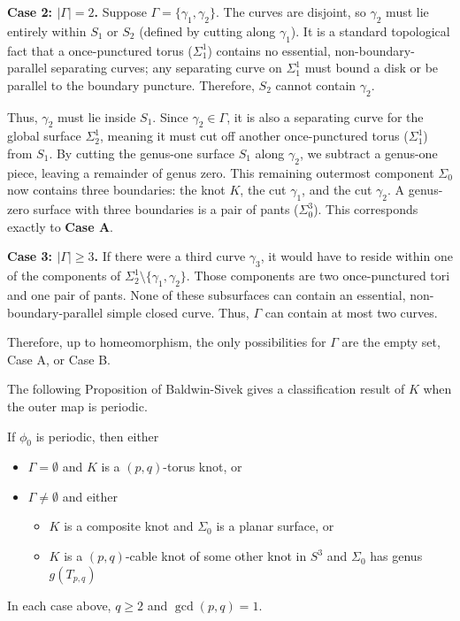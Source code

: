 \begin{myproof}
    \textbf{Case 2: $|\Gamma| = 2$.}
    Suppose $\Gamma = \{\gamma_1, \gamma_2\}$. The curves are disjoint, so $\gamma_2$ must lie entirely within $S_1$ or $S_2$ (defined by cutting along $\gamma_1$). It is a standard topological fact that a once-punctured torus ($\Sigma_1^1$) contains no essential, non-boundary-parallel separating curves; any separating curve on $\Sigma_1^1$ must bound a disk or be parallel to the boundary puncture. Therefore, $S_2$ cannot contain $\gamma_2$.

    Thus, $\gamma_2$ must lie inside $S_1$. Since $\gamma_2 \in \Gamma$, it is also a separating curve for the global surface $\Sigma_2^1$, meaning it must cut off another once-punctured torus ($\Sigma_1^1$) from $S_1$.
    By cutting the genus-one surface $S_1$ along $\gamma_2$, we subtract a genus-one piece, leaving a remainder of genus zero. This remaining outermost component $\Sigma_0$ now contains three boundaries: the knot $K$, the cut $\gamma_1$, and the cut $\gamma_2$. A genus-zero surface with three boundaries is a pair of pants ($\Sigma_0^3$). This corresponds exactly to \textbf{Case A}.

    \textbf{Case 3: $|\Gamma| \geq 3$.} If there were a third curve $\gamma_3$, it would have to reside within one of the components of $\Sigma_2^1 \setminus \{\gamma_1, \gamma_2\}$. Those components are two once-punctured tori and one pair of pants. None of these subsurfaces can contain an essential, non-boundary-parallel simple closed curve. Thus, $\Gamma$ can contain at most two curves.

    Therefore, up to homeomorphism, the only possibilities for $\Gamma$ are the empty set, Case A, or Case B.
\end{myproof}



The following Proposition of Baldwin-Sivek gives a classification result of $K$ when the outer map is periodic.

\begin{prop} \label{prop:knottracesprop}
If $\phi_0$ is periodic, then either
    \begin{itemize}
        \item $\Gamma = \emptyset$ and $K$ is a $(p, q)$-torus knot, or
        \item $\Gamma  \neq \emptyset$ and either
        \begin{itemize}
            \item $K$ is a composite knot and $\Sigma_0$ is a planar surface, or
            \item $K$ is a $(p, q)$-cable knot of some other knot in $S^3$ and $\Sigma_0$ has genus $g(T_{p,q})$
        \end{itemize}
    \end{itemize}
    In each case above, $q \geq 2$ and $\gcd(p, q) = 1$.
\end{prop}


